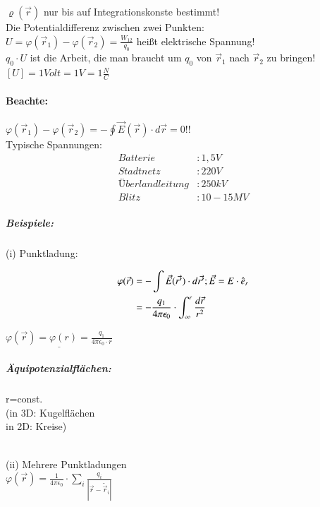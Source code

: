 \documentclass[11pt]{article}
\begin{document}
$ \varrho(\vec{r}) $ nur bis auf Integrationskonste bestimmt!\\
Die Potentialdifferenz zwischen zwei Punkten:\\

$ U = \varphi(\vec{r}_1)-\varphi(\vec{r}_2) = \frac{W_{12}}{q_0}$ hei\ss{}t elektrische Spannung!\\

$q_0\cdot U$ ist die Arbeit, die man braucht um $q_0$ von $ \vec{r}_1 $ nach $ \vec{r}_2 $ zu bringen!\\

$[U]= 1Volt = 1V = 1\frac{N}{C}$\\

\paragraph{Beachte:} $ \varphi(\vec{r}_1)-\varphi(\vec{r}_2) = -{\displaystyle\oint} \vec{E}(\vec{r})\cdot d\vec{r}= 0!!$\\

Typische Spannungen:
\begin{align*}
	Batterie&: 1,5V\\
	Stadtnetz&: 220V\\
	Überlandleitung&: 250kV\\
	Blitz&: 10-15MV
\end{align*}

\subparagraph{Beispiele:}

(i) Punktladung:

\begin{align*}
	\displaystyle \varphi(\vec{r})&= -\int \vec{E}(\vec{r'})\cdot d\vec{r'}; \vec{E}=E\cdot\hat{e}_r\\
	\displaystyle &=-\frac{q_1}{4\pi\epsilon_0}\cdot\int_{\infty}^{r} \frac{d\vec{r}}{r^2}
\end{align*}

$\underline{\varphi(\vec{r})=\varphi(r)=\frac{q_1}{4\pi\epsilon_0\cdot r}}$\\

\subparagraph{Äquipotenzialflächen:} r=const.\\
(in 3D: Kugelflächen\\
in 2D: Kreise)

\hfill\\

(ii) Mehrere Punktladungen\\

$\displaystyle\varphi(\vec{r})=\frac{1}{4\pi\epsilon_0}\cdot\sum_{i} \frac{q_i}{|\vec{r}-\tilde{\vec{r}}_i|}$
\end{document}
